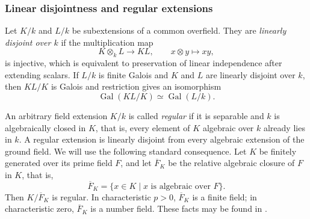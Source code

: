 \documentclass[11pt,letterpaper,reqno]{amsart}
\theoremstyle{definition}
\DeclareMathOperator{\Gal}{Gal}
\begin{document}
\subsubsection{Linear disjointness and regular extensions}\label{Linear disjointness and regular extensions}
Let $K/k$ and $L/k$ be subextensions of a common overfield.  They are
\emph{linearly disjoint over $k$} if the multiplication map
$$
K\otimes_k L\longrightarrow KL,
\qquad x\otimes y\longmapsto xy,
$$
is injective, which is
equivalent to preservation of linear independence after extending scalars.
If $L/k$ is finite Galois and $K$ and $L$ are linearly disjoint over $k$,
then $KL/K$ is Galois and restriction gives an isomorphism
\begin{equation}\label{eq:galois}
\Gal(KL/K)\simeq \Gal(L/k).
\end{equation}










An arbitrary field extension $K/k$ is called \emph{regular} if it is
separable and $k$ is algebraically closed in $K$, that is, every element of $K$ algebraic over
$k$ already lies in $k$.  A regular extension is
linearly disjoint from every algebraic extension of the ground field.  We
will use the following standard consequence.  Let $K$ be finitely generated
over its prime field $F$, and let $\overline{F}_K$ be the relative algebraic closure of $F$ in $K$, that is,
$$
\overline{F}_K=\{x\in K\mid x\text{ is algebraic over }F\}.
$$
Then $K/\overline{F}_K$ is regular.  In characteristic $p>0$,
$\overline{F}_K$ is a finite field; in characteristic zero, $\overline{F}_K$ is a number field.
These facts may be found in
\cite[Chapters~V and VI]{Lang}.
\end{document}
